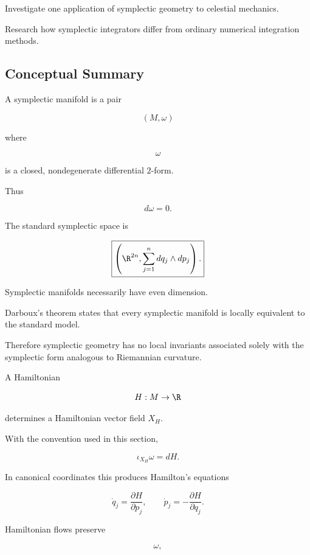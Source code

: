 \begin{exercise}[4]
Investigate one application of symplectic geometry to celestial mechanics.
\end{exercise}

\begin{exercise}[4]
Research how symplectic integrators differ from ordinary numerical
integration methods.
\end{exercise}

\subsection{Conceptual Summary}
\label{subsec:symplectic-summary}

A symplectic manifold is a pair

\[
\boxed{
(M,\omega)
}
\]

where

\[
\omega
\]

is a closed, nondegenerate differential \(2\)-form.

Thus

\[
\boxed{
d\omega=0.
}
\]

The standard symplectic space is

\[
\boxed{
\left(
\R^{2n},
\sum_{j=1}^{n}dq_j\wedge dp_j
\right).
}
\]

Symplectic manifolds necessarily have even dimension.

Darboux's theorem states that every symplectic manifold is locally equivalent
to the standard model.

Therefore symplectic geometry has no local invariants associated solely with
the symplectic form analogous to Riemannian curvature.

A Hamiltonian

\[
H:M\to\R
\]

determines a Hamiltonian vector field \(X_H\).

With the convention used in this section,

\[
\boxed{
\iota_{X_H}\omega=dH.
}
\]

In canonical coordinates this produces Hamilton's equations

\[
\boxed{
\dot q_j
=
\frac{\partial H}{\partial p_j},
\qquad
\dot p_j
=
-
\frac{\partial H}{\partial q_j}.
}
\]

Hamiltonian flows preserve

\[
\boxed{
\omega,
}
\]

